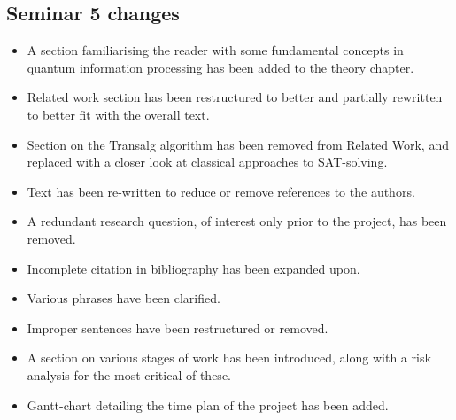 \documentclass[msc,lith,english]{liuthesis}
\begin{document}
\subsection{Seminar 5 changes}
\begin{itemize}
    \item A section familiarising the reader with some fundamental concepts in quantum information processing has been added to the theory chapter.
    \item Related work section has been restructured to better and partially rewritten to better fit with the overall text.
    \item Section on the Transalg algorithm has been removed from Related Work, and replaced with a closer look at classical approaches to SAT-solving.
    \item Text has been re-written to reduce or remove references to the authors.
    \item A redundant research question, of interest only prior to the project, has been removed.
    \item Incomplete citation in bibliography has been expanded upon.
    \item Various phrases have been clarified.
    \item Improper sentences have been restructured or removed.
    \item A section on various stages of work has been introduced, along with a risk analysis for the most critical of these.
    \item Gantt-chart detailing the time plan of the project has been added.
\end{itemize}

\printbibliography
\end{document}
